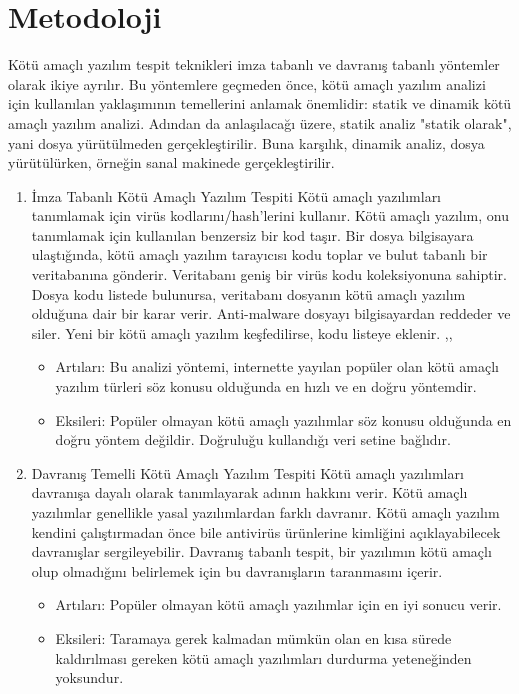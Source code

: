 \documentclass[12pt, a4paper]{article}
\begin{document}
\section{Metodoloji}
Kötü amaçlı yazılım tespit teknikleri imza tabanlı ve davranış tabanlı yöntemler olarak ikiye ayrılır. Bu yöntemlere geçmeden önce, kötü amaçlı yazılım analizi için kullanılan yaklaşımının temellerini anlamak önemlidir: statik ve dinamik kötü amaçlı yazılım analizi. Adından da anlaşılacağı üzere, statik analiz "statik olarak", yani dosya yürütülmeden gerçekleştirilir. Buna karşılık, dinamik analiz, dosya yürütülürken, örneğin sanal makinede  gerçekleştirilir.
\begin{enumerate}
\item İmza Tabanlı Kötü Amaçlı Yazılım Tespiti
Kötü amaçlı yazılımları tanımlamak için virüs kodlarını/hash'lerini kullanır. Kötü amaçlı yazılım, onu tanımlamak için kullanılan benzersiz bir kod taşır. Bir dosya bilgisayara ulaştığında, kötü amaçlı yazılım tarayıcısı kodu toplar ve bulut tabanlı bir veritabanına gönderir. Veritabanı geniş bir virüs kodu koleksiyonuna sahiptir. Dosya kodu listede bulunursa, veritabanı dosyanın kötü amaçlı yazılım olduğuna dair bir karar verir. Anti-malware dosyayı bilgisayardan reddeder ve siler. Yeni bir kötü amaçlı yazılım keşfedilirse, kodu listeye eklenir.
,,
\begin{itemize}
\item Artıları:
 Bu analizi yöntemi, internette yayılan popüler olan kötü amaçlı yazılım türleri söz konusu olduğunda en hızlı ve en doğru yöntemdir.
\item Eksileri:
Popüler olmayan kötü amaçlı yazılımlar söz konusu olduğunda en doğru yöntem değildir. Doğruluğu kullandığı veri setine bağlıdır.
\end{itemize}
\item Davranış Temelli Kötü Amaçlı Yazılım Tespiti
Kötü amaçlı yazılımları davranışa dayalı olarak tanımlayarak adının hakkını verir. Kötü amaçlı yazılımlar genellikle yasal yazılımlardan farklı davranır. Kötü amaçlı yazılım kendini çalıştırmadan önce bile antivirüs ürünlerine kimliğini açıklayabilecek davranışlar sergileyebilir. Davranış tabanlı tespit, bir yazılımın kötü amaçlı olup olmadığını belirlemek için bu davranışların taranmasını içerir\cite{met1}.
\begin{itemize}
\item Artıları:
Popüler olmayan kötü amaçlı yazılımlar için en iyi sonucu verir.
\item Eksileri:
Taramaya gerek kalmadan mümkün olan en kısa sürede kaldırılması gereken kötü amaçlı yazılımları durdurma yeteneğinden yoksundur.
\end{itemize}
\end{enumerate}
\end{document}
